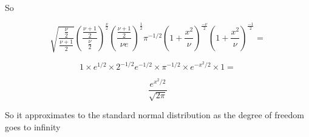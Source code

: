 \documentclass{article}
\begin{document}
So 

$${\sqrt{\frac{{\frac{\nu}{2}}}{\frac{\nu+1}{2}}}(\frac{\frac{\nu+1}{2}}{\frac{\nu}{2}})^{\frac{\nu}{2}} (\frac{\frac{\nu+1}{2}}{\nu e})^{\frac{1}{2}} } {{ \pi}}^{-1/2} {(1+\frac{x^2}{\nu})^{\frac{-\nu}{2}}} {(1+\frac{x^2}{\nu})^{\frac{-1}{2}}} = $$

$$1\times e^{1/2} \times2^{-1/2} e^{-1/2} \times {{ \pi}}^{-1/2} \times  e^{-x^2/2} \times 1=$$

$$\frac{e^{x^2/2}}{\sqrt{2\pi}}$$

So it approximates to the standard normal distribution as the degree of freedom goes to infinity
\end{document}
